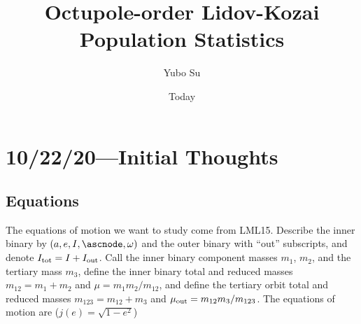 \documentclass[11pt,
        usenames, %
        dvipsnames %
    ]{article}
\newcommand*{\p}[1]{\left(#1\right)}
\begin{document}
\linespread{1.15}

\title{Octupole-order Lidov-Kozai Population Statistics}
\author{Yubo Su}
\date{Today}

\maketitle

\section{10/22/20---Initial Thoughts}

\subsection{Equations}

The equations of motion we want to study come from LML15. Describe the inner
binary by $\p{a, e, I, \ascnode, \omega}$ and the outer binary with ``out''
subscripts, and denote $I_{\rm tot} = I + I_{\rm out}$. Call the inner binary
component masses $m_1$, $m_2$, and the tertiary mass $m_3$, define the inner
binary total and reduced masses $m_{12} = m_1 + m_2$ and $\mu = m_1m_2 /
m_{12}$, and define the tertiary orbit total and reduced masses $m_{123} =
m_{12} + m_3$ and $\mu_{\rm out} = m_{12}m_3 / m_{123}$. The equations of motion
are ($j(e) = \sqrt{1 - e^2}$)
\end{document}
